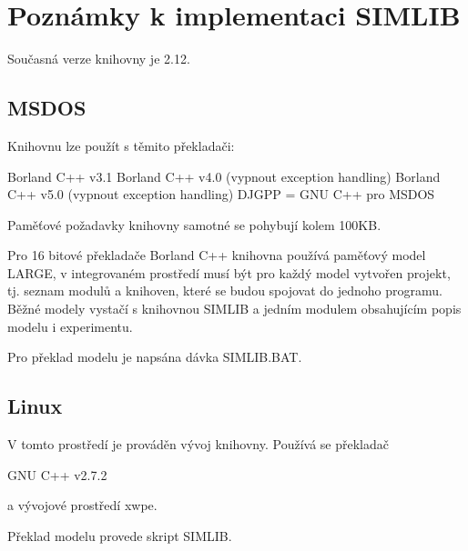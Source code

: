 \documentclass[a4paper]{article}
\begin{document}
\section{Poznámky k implementaci SIMLIB}

Současná verze  knihovny je 2.12.

\subsection{MSDOS}

Knihovnu lze použít  s těmito překladači:

   Borland C++ v3.1
   Borland C++ v4.0 (vypnout exception handling)
   Borland C++ v5.0 (vypnout exception handling)
   DJGPP = GNU C++ pro MSDOS

Paměťové požadavky knihovny samotné se pohybují kolem 100KB.

Pro 16 bitové překladače Borland C++ knihovna používá paměťový  model
LARGE, v integrovaném  prostředí  musí  být  pro  každý  model vytvořen
projekt, tj.  seznam modulů a knihoven,  které se budou spojovat do  jednoho
programu.  Běžné modely  vystačí s  knihovnou SIMLIB a jedním modulem
obsahujícím popis modelu i experimentu.

Pro překlad modelu je napsána dávka SIMLIB.BAT.


\subsection{Linux}

V tomto prostředí je prováděn vývoj knihovny. Používá se překladač

   GNU C++ v2.7.2

a vývojové prostředí xwpe.

Překlad modelu provede skript SIMLIB.
\end{document}

